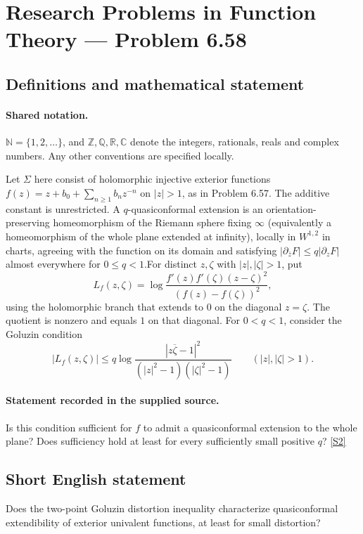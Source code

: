 \documentclass[11pt]{article}
\newcommand{\sref}[2]{\hyperlink{source:#1:#2}{[S#2]}}
\begin{document}
\section{Research Problems in Function Theory — Problem 6.58}\label{statement}

\subsection{Definitions and mathematical statement}

\paragraph{Shared notation.}$\mathbb N=\{1,2,\ldots\}$, and $\mathbb Z,\mathbb Q,\mathbb R,\mathbb C$ denote the integers, rationals, reals and complex numbers. Any other conventions are specified locally.


Let $\Sigma$ here consist of holomorphic injective exterior functions $f(z)=z+b_0+\sum_{n\ge1}b_nz^{-n}$ on $|z|>1$, as in Problem 6.57. The additive constant is unrestricted. A $q$-quasiconformal extension is an orientation-preserving homeomorphism of the Riemann sphere fixing $\infty$ (equivalently a homeomorphism of the whole plane extended at infinity), locally in $W^{1,2}$ in charts, agreeing with the function on its domain and satisfying $|\partial_{\bar z}F|\le q|\partial_zF|$ almost everywhere for $0\le q<1$.For distinct $z,\zeta$ with $|z|,|\zeta|>1$, put
\[L_f(z,\zeta)=\log\frac{f'(z)f'(\zeta)(z-\zeta)^2}{(f(z)-f(\zeta))^2},\]
using the holomorphic branch that extends to $0$ on the diagonal $z=\zeta$. The quotient is nonzero and equals $1$ on that diagonal. For $0<q<1$, consider the Goluzin condition
\[|L_f(z,\zeta)|\le q\log\frac{|z\overline\zeta-1|^2}{(|z|^2-1)(|\zeta|^2-1)}\qquad(|z|,|\zeta|>1).\]
\paragraph{Statement recorded in the supplied source.}
Is this condition sufficient for $f$ to admit a quasiconformal extension to the whole plane? Does sufficiency hold at least for every sufficiently small positive $q$? \sref{statement}{2}
\subsection{Short English statement}
Does the two-point Goluzin distortion inequality characterize quasiconformal extendibility of exterior univalent functions, at least for small distortion?
\end{document}
